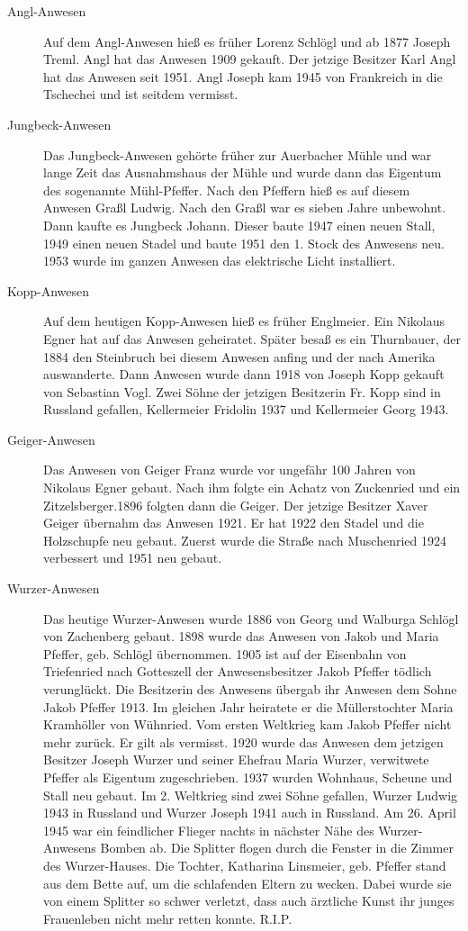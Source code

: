 \documentclass{book}
\begin{document}
\begin{description}
\item[Angl-Anwesen] Auf dem Angl-Anwesen hieß es früher Lorenz Schlögl
und ab 1877 Joseph Treml. Angl hat das Anwesen 1909 gekauft. Der jetzige
Besitzer Karl Angl hat das Anwesen seit 1951. Angl Joseph kam 1945 von
Frankreich in die Tschechei und ist seitdem vermisst.

\item[Jungbeck-Anwesen] Das Jungbeck-Anwesen gehörte früher zur
Auerbacher Mühle und war lange Zeit das Ausnahmshaus der Mühle und wurde
dann das Eigentum des sogenannte Mühl-Pfeffer. Nach den Pfeffern hieß es
auf diesem Anwesen Graßl Ludwig. Nach den Graßl war es sieben Jahre
unbewohnt. Dann kaufte es Jungbeck Johann. Dieser baute 1947 einen neuen
Stall, 1949 einen neuen Stadel und baute 1951 den 1. Stock des Anwesens
neu. 1953 wurde im ganzen Anwesen das elektrische Licht installiert.

\item[Kopp-Anwesen] Auf dem heutigen Kopp-Anwesen hieß es früher
Englmeier. Ein Nikolaus Egner hat auf das Anwesen geheiratet. Später
besaß es ein Thurnbauer, der 1884 den Steinbruch bei diesem Anwesen
anfing und der nach Amerika auswanderte. Dann Anwesen wurde dann 1918
von Joseph Kopp gekauft von Sebastian Vogl. Zwei Söhne der jetzigen
Besitzerin Fr. Kopp sind in Russland gefallen, Kellermeier Fridolin 1937
und Kellermeier Georg 1943.

\item[Geiger-Anwesen] Das Anwesen von Geiger Franz wurde vor ungefähr
100 Jahren von Nikolaus Egner gebaut. Nach ihm folgte ein Achatz von
Zuckenried und ein Zitzelsberger.1896 folgten dann die Geiger. Der
jetzige Besitzer Xaver Geiger übernahm das Anwesen 1921. Er hat 1922 den
Stadel und die Holzschupfe neu gebaut. Zuerst wurde die Straße nach
Muschenried 1924 verbessert und 1951 neu gebaut.

\item[Wurzer-Anwesen] Das heutige Wurzer-Anwesen wurde 1886 von Georg
und Walburga Schlögl von Zachenberg gebaut. 1898 wurde das Anwesen von
Jakob und Maria Pfeffer, geb. Schlögl übernommen. 1905 ist auf der
Eisenbahn von Triefenried nach Gotteszell der Anwesensbesitzer Jakob
Pfeffer tödlich verunglückt. Die Besitzerin des Anwesens übergab ihr
Anwesen dem Sohne Jakob Pfeffer 1913. Im gleichen Jahr heiratete er die
Müllerstochter Maria Kramhöller von Wühnried. Vom ersten Weltkrieg kam
Jakob Pfeffer nicht mehr zurück. Er gilt als vermisst. 1920 wurde das
Anwesen dem jetzigen Besitzer Joseph Wurzer und seiner Ehefrau Maria
Wurzer, verwitwete Pfeffer als Eigentum zugeschrieben. 1937 wurden
Wohnhaus, Scheune und Stall neu gebaut. Im 2. Weltkrieg sind zwei Söhne
gefallen, Wurzer Ludwig 1943 in Russland und Wurzer Joseph 1941 auch in
Russland. Am 26. April 1945 war ein feindlicher Flieger nachts in
nächster Nähe des Wurzer-Anwesens Bomben ab. Die Splitter flogen durch
die Fenster in die Zimmer des Wurzer-Hauses. Die Tochter, Katharina
Linsmeier, geb. Pfeffer stand aus dem Bette auf‚ um die schlafenden
Eltern zu wecken. Dabei wurde sie von einem Splitter so schwer verletzt,
dass auch ärztliche Kunst ihr junges Frauenleben nicht mehr retten
konnte. R.I.P.
\end{description}
\end{document}
